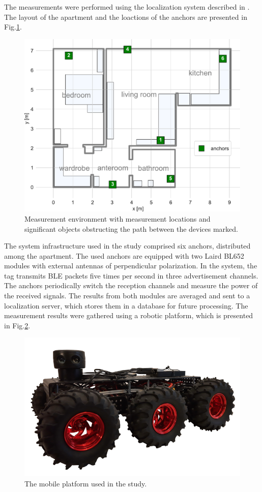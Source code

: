 \documentclass[conference, 11pt, onecolumn]{IEEEtran}
\begin{document}
The measurements were performed using the localization system described in \cite{b1}. The layout of the apartment and the loactions of the anchors are presented in Fig.\ref{plan}.

\begin{figure}[h]
\centerline{\includegraphics[width=.7\columnwidth]{figs/layout}}
\caption{Measurement environment with measurement locations and significant objects obstructing the path between the devices marked.}
\label{plan}
\end{figure}

The system infrastructure used in the study comprised six anchors, distributed among the apartment. The used anchors are equipped with two Laird BL652 modules with external antennas of perpendicular polarization. In the system, the tag transmits BLE packets five times per second in three advertisement channels. The anchors periodically switch the reception channels and measure the power of the received signals. The results from both modules are averaged and sent to a localization server, which stores them in a database for future processing. The measurement results were gathered using a robotic platform, which is presented in Fig.\ref{fig:robot}.

\begin{figure}[h]
\centering
\includegraphics[width=0.5\columnwidth]{figs/robot}
\caption{\label{fig:robot}The mobile platform used in the study.}
\end{figure}
\end{document}
